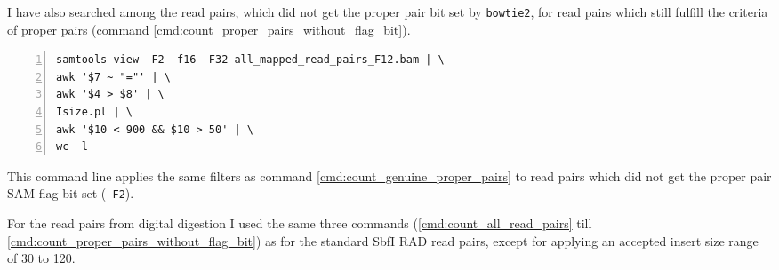 \documentclass[a4paper,12pt,times,authoryear,twoside,print,index]{Classes/PhDThesisPSnPDF}\usepackage[]{graphicx}\usepackage[]{color}
\begin{document}
%
I have also searched among the read pairs, which did not get the \gls{proper pair} bit set by \texttt{bowtie2}, for read pairs which still fulfill the criteria of proper pairs (command \ref{cmd:count_proper_pairs_without_flag_bit}).
%
\begin{cmd}
\captionsetup{type=cmd}
\begin{Verbatim}[fontsize=\scriptsize, formatcom=\color{darkgray}, numbers=left]
samtools view -F2 -f16 -F32 all_mapped_read_pairs_F12.bam | \
awk '$7 ~ "="' | \
awk '$4 > $8' | \
Isize.pl | \
awk '$10 < 900 && $10 > 50' | \
wc -l
\end{Verbatim}
\caption{\small This command line applies the same filters as command \ref{cmd:count_genuine_proper_pairs} to read pairs which did not get the \gls{proper pair} SAM flag bit set (\texttt{-F2}).}
\label{cmd:count_proper_pairs_without_flag_bit}
\end{cmd}
%
For the read pairs from digital digestion I used the same three commands (\ref{cmd:count_all_read_pairs} till \ref{cmd:count_proper_pairs_without_flag_bit}) as for the standard SbfI RAD read pairs, except for applying an accepted insert size range of 30 to 120.
\end{document}
